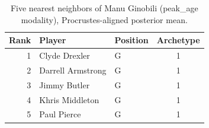 \begin{table}[htbp]
  \centering\small
  \begin{tabular}{rllc}
    \toprule
    Rank & Player & Position & Archetype \\
    \midrule
    1 & Clyde Drexler & G & 1 \\
    2 & Darrell Armstrong & G & 1 \\
    3 & Jimmy Butler & G & 1 \\
    4 & Khris Middleton & G & 1 \\
    5 & Paul Pierce & G & 1 \\
    \bottomrule
  \end{tabular}
  \caption{Five nearest neighbors of Manu Ginobili (peak_age modality), Procrustes-aligned posterior mean.}
  \label{tab:Manu_Ginobili_neighbors_peak_age}
\end{table}

